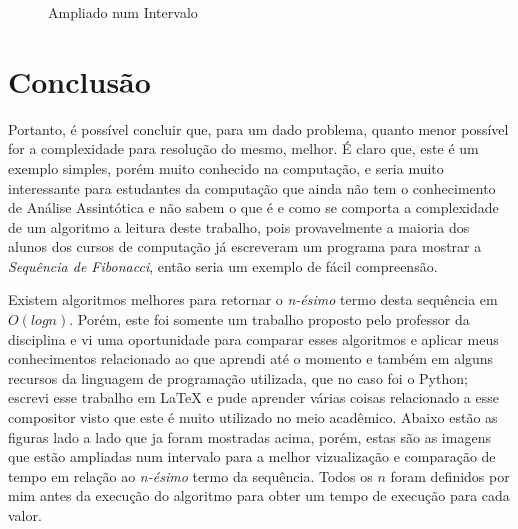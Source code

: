 \documentclass[a4paper, 12pt]{article}
\begin{document}
\begin{figure}[h]
\begin{minipage}[b]{0.45\linewidth}
\caption{Ampliado num Intervalo}
\end{minipage}
\end{figure} 
\newpage

\section{Conclusão}

Portanto, é possível concluir que, para um dado problema, quanto menor possível for a complexidade para resolução do mesmo, melhor. É claro que, este é um exemplo simples, porém muito conhecido na computação, e seria muito interessante para estudantes da computação que ainda não tem o conhecimento de Análise Assintótica e não sabem o que é e como se comporta a complexidade de um algoritmo a leitura deste trabalho, pois provavelmente a maioria dos alunos dos cursos de computação já escreveram um programa para mostrar a {\it Sequência de Fibonacci}, então seria um exemplo de fácil compreensão.

Existem algoritmos melhores para retornar o {\it n-ésimo} termo desta sequência em $O(logn)$. Porém, este foi somente um trabalho proposto pelo professor da disciplina e vi uma oportunidade para comparar esses algoritmos e aplicar meus conhecimentos relacionado ao que aprendi até o momento e também em alguns recursos da linguagem de programação utilizada, que no caso foi o Python; escrevi esse trabalho em LaTeX e pude aprender várias coisas relacionado a esse compositor visto que este é muito utilizado no meio acadêmico. 
\newpage
Abaixo estão as figuras lado a lado que ja foram mostradas acima, porém, estas são as imagens que estão ampliadas num intervalo para a melhor vizualização e comparação de tempo em relação ao {\it n-ésimo} termo da sequência. Todos os $n$ foram definidos por mim antes da execução do algoritmo para obter um tempo de execução para cada valor.
\end{document}
